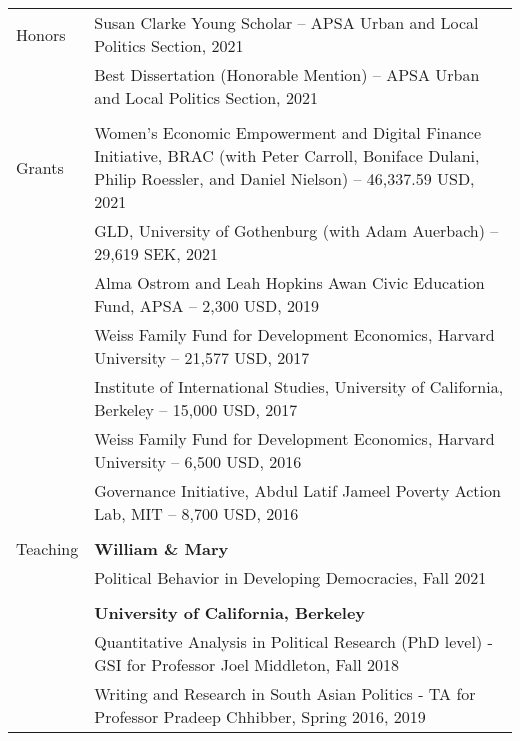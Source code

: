 \documentclass[letterpaper, 10pt]{article}
\begin{document}
\begin{longtable}{p{1in}p{5.5in}}
{{Honors}} 
& Susan Clarke Young Scholar  -- APSA Urban and Local Politics Section, 2021\\

& Best Dissertation  (Honorable Mention) --  APSA Urban and Local Politics Section, 2021 \\

& \\

{{Grants}} 
& Women's Economic Empowerment and Digital Finance Initiative, BRAC (with Peter Carroll, Boniface Dulani, Philip Roessler, and Daniel Nielson)
 -- 46,337.59 USD, 2021\\



& GLD, University of Gothenburg (with Adam Auerbach)
-- 29,619 SEK, 2021 \\


& Alma Ostrom and Leah Hopkins Awan Civic Education Fund, APSA -- 2,300 USD, 2019\\

& Weiss Family Fund for Development Economics, Harvard University -- 21,577 USD, 2017
\\

&Institute of International Studies, University of California, Berkeley -- 15,000 USD, 2017 \\

&Weiss Family Fund for Development Economics, Harvard University -- 6,500 USD, 2016  \\

&Governance Initiative, Abdul Latif Jameel Poverty Action Lab, MIT -- 8,700 USD, 2016 \\

& \\



{{Teaching}} & \textbf{William \& Mary} \\
&Political Behavior in Developing Democracies, Fall 2021 \\
&\\

& \textbf{University of California, Berkeley}\\
& Quantitative Analysis in Political Research (PhD level) - GSI for Professor Joel Middleton, Fall 2018 \\

& Writing and Research in South Asian Politics - TA for Professor Pradeep Chhibber, Spring 2016, 2019\\


\end{longtable}
\end{document}
